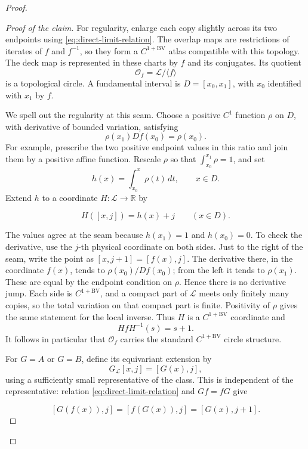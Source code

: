 \documentclass[11pt]{article}
\theoremstyle{definition}
\theoremstyle{remark}
\begin{document}
\begin{proof}
\begin{proof}[Proof of the claim]
For regularity, enlarge each copy slightly across its two endpoints using
\eqref{eq:direct-limit-relation}.  The overlap maps are restrictions of
iterates of \(f\) and \(f^{-1}\), so they form a
\(C^{1+\mathrm{BV}}\) atlas compatible with this topology.  The deck map
is represented in these charts by \(f\) and its conjugates.  Its quotient
\[
 \mathscr O_f=\mathscr L/\langle f\rangle
\]
is a topological circle.  A fundamental interval is
$D=[x_0,x_1]$, with $x_0$ identified with $x_1$ by $f$.

We spell out the regularity at this seam.  Choose a positive $C^1$ function
$\rho$ on $D$, with derivative of bounded variation, satisfying
\[
 \rho(x_1)Df(x_0)=\rho(x_0).
\]
For example, prescribe the two positive endpoint values in this ratio and
join them by a positive affine function.  Rescale \(\rho\) so that
\(\int_{x_0}^{x_1}\rho=1\), and
set
\[
 h(x)=\int_{x_0}^x\rho(t)\,dt,\qquad x\in D.
\]
Extend $h$ to a coordinate $H:\mathscr L\to\mathbb R$ by

\[
 H([x,j])=h(x)+j \qquad (x\in D).
\]

The values agree at the seam because \(h(x_1)=1\) and \(h(x_0)=0\).
To check the derivative, use the \(j\)-th physical coordinate on both sides.
Just to the right of the seam, write the point as
\([x,j+1]=[f(x),j]\).  The derivative there, in the coordinate \(f(x)\),
tends to \(\rho(x_0)/Df(x_0)\); from the left it tends to \(\rho(x_1)\).
These are equal by the endpoint condition on \(\rho\).  Hence there is no
derivative jump.  Each side is \(C^{1+\mathrm{BV}}\), and a compact part of
\(\mathscr L\) meets only finitely many copies, so the total variation on
that compact part is finite.  Positivity of \(\rho\) gives the same
statement for the local inverse.  Thus \(H\) is a
\(C^{1+\mathrm{BV}}\) coordinate and
\begin{equation}\label{eq:orbit-deck}
 HfH^{-1}(s)=s+1.
\end{equation}
It follows in particular that $\mathscr O_f$ carries the standard
$C^{1+\mathrm{BV}}$ circle structure.

For \(G=A\) or \(G=B\), define its equivariant extension by
\begin{equation}\label{eq:direct-limit-G}
 G_{\mathscr L}[x,j]=[G(x),j],
\end{equation}
using a sufficiently small representative of the class.  This is
independent of the representative: relation
\eqref{eq:direct-limit-relation} and \(Gf=fG\) give

\[
 [G(f(x)),j]=[f(G(x)),j]=[G(x),j+1].
\]


\end{proof}
\end{proof}
\end{document}
